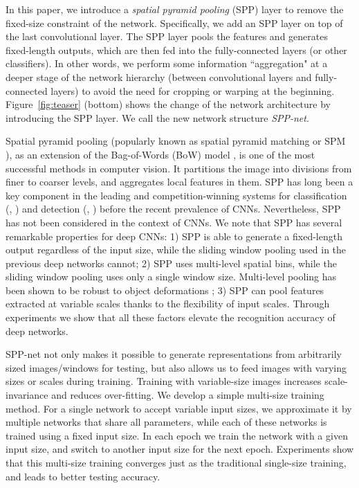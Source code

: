 \documentclass[10pt,journal,cspaper,compsoc]{IEEEtran}
\begin{document}
In this paper, we introduce a \emph{spatial pyramid pooling} (SPP) \cite{Grauman2005,Lazebnik2006} layer to remove the fixed-size constraint of the network. Specifically, we add an SPP layer on top of the last convolutional layer. The SPP layer pools the features and generates fixed-length outputs, which are then fed into the fully-connected layers (or other classifiers).
In other words, we perform some information ``aggregation" at a deeper stage of the network hierarchy (between convolutional layers and fully-connected layers) to avoid the need for cropping or warping at the beginning.
Figure~\ref{fig:teaser} (bottom) shows the change of the network architecture by introducing the SPP layer. We call the new network structure \emph{SPP-net}.


Spatial pyramid pooling \cite{Grauman2005,Lazebnik2006} (popularly known as spatial pyramid matching or SPM \cite{Lazebnik2006}), as an extension of the Bag-of-Words (BoW) model \cite{Sivic2003}, is one of the most successful methods in computer vision. It partitions the image into divisions from finer to coarser levels, and aggregates local features in them.
SPP has long been a key component in the leading and competition-winning systems for classification (\eg, \cite{Yang2009,Wang2010,Perronnin2010}) and detection (\eg, \cite{Sande2011}) before the recent prevalence of CNNs.
Nevertheless, SPP has not been considered in the context of CNNs. We note that SPP has several remarkable properties for deep CNNs: 1) SPP is able to generate a fixed-length output regardless of the input size, while the sliding window pooling used in the previous deep networks \cite{Krizhevsky2012} cannot; 2) SPP uses multi-level spatial bins, while the sliding window pooling uses only a single window size. Multi-level pooling has been shown to be robust to object deformations \cite{Lazebnik2006}; 3) SPP can pool features extracted at variable scales thanks to the flexibility of input scales.
Through experiments we show that all these factors elevate the recognition accuracy of deep networks.

SPP-net not only makes it possible to generate representations from arbitrarily sized images/windows for testing,
but also allows us to feed images with varying sizes or scales during training. Training with variable-size images increases scale-invariance and reduces over-fitting. We develop a simple multi-size training method. For a single network to accept variable input sizes, we approximate it by multiple networks that share all parameters, while each of these networks is trained using a fixed input size. In each epoch we train the network with a given input size, and switch to another input size for the next epoch. Experiments show that this multi-size training converges just as the traditional single-size training, and leads to better testing accuracy.
\end{document}
